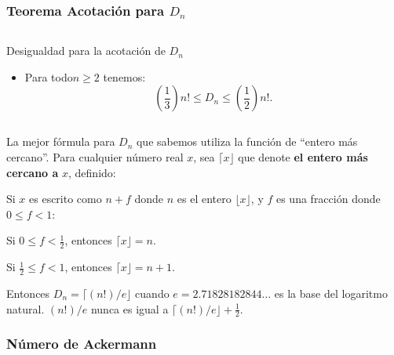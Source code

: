 \begin{frame}
\frametitle{Teorema Acotación para $D_{n}$}
\begin{columns}
	\begin{column}{\textwidth}
		\begin{block}{Desigualdad para la acotación de $D_{n}$}
			\begin{itemize}
			\item Para todo$n\geq2$ tenemos: \[ \left(\frac{1}{3}\right)n!\leq D_{n}\leq\left(\frac{1}{2}\right)n!. \]
			\end{itemize}
		\end{block}
	\end{column}
\end{columns}

La mejor fórmula para $D_{n}$ que sabemos utiliza la función de ``entero más cercano''. Para cualquier número real $x$, sea $\lceil x\rfloor$ que denote \textbf{el entero más cercano a} $x$, definido:

Si $x$ es escrito como $n+f$ donde $n$ es el entero $\lfloor x\rfloor$, y $f$ es una fracción donde $0\leq f<1$:

Si $0\leq f<\frac{1}{2}$, entonces $\lceil x\rfloor=n$.

Si $\frac{1}{2}\leq f<1$, entonces $\lceil x\rfloor=n+1$.

Entonces $D_{n}=\lceil(n!)/e\rfloor$ cuando $e=2.71828182844\ldots$ es la base del logaritmo natural. $(n!)/e$  nunca es igual a $\lceil(n!)/e\rfloor+\frac{1}{2}$.
\end{frame}

\subsubsection{Número de Ackermann}


